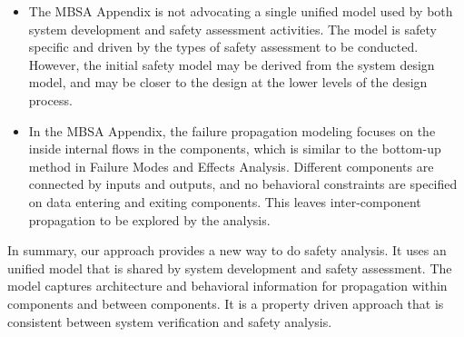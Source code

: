 \begin{itemize}
	\item The MBSA Appendix is not advocating a single unified model used by both system development and safety assessment activities. The model is safety specific and driven by the types of safety assessment to be conducted. However, the initial safety model may be derived from the system design model, and may be closer to the design at the lower levels of the design process.
	\item In the MBSA Appendix, the failure propagation modeling focuses on the inside internal flows in the components, which is similar to the bottom-up method in Failure Modes and Effects Analysis. Different components are connected by inputs and outputs, and no behavioral constraints are specified on data entering and exiting components. This leaves inter-component propagation to be explored by the analysis.
\end{itemize}

In summary, our approach provides a new way to do safety analysis. It uses an unified model that is shared by system development and safety assessment. The model captures architecture and behavioral information for propagation within components and between components. It is a property driven approach that is consistent between system verification and safety analysis.




































